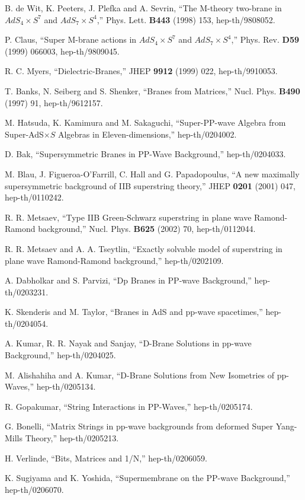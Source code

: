 \documentclass[a4paper,12pt]{article}
\begin{document}
\begin{thebibliography}{99}
 B. de Wit, K. Peeters, J. Plefka and A. Sevrin,
``The M-theory two-brane in $AdS_4 \times S^7$ and $AdS_7 \times
S^4$,'' Phys. Lett. {\bf B443} (1998) 153, hep-th/9808052.

 P. Claus, ``Super M-brane actions in $AdS_4
\times S^7$ and $AdS_7 \times S^4$,'' Phys. Rev. {\bf D59} (1999)
066003, hep-th/9809045.

 R. C. Myers, ``Dielectric-Branes,'' JHEP {\bf
9912} (1999) 022, hep-th/9910053.

 T. Banks, N. Seiberg and S. Shenker, ``Branes
from Matrices,'' Nucl. Phys. {\bf B490} (1997) 91, hep-th/9612157.

 M. Hatsuda, K. Kamimura and M. Sakaguchi,
``Super-PP-wave Algebra from Super-AdS$\times S$ Algebras in
Eleven-dimensions,'' hep-th/0204002.

 D. Bak, ``Supersymmetric Branes in PP-Wave
Background,'' hep-th/0204033.

 M. Blau, J. Figueroa-O'Farrill, C. Hall and G.
Papadopoulus, ``A new maximally supersymmetric background of IIB
superstring theory,'' JHEP {\bf 0201} (2001) 047, hep-th/0110242.

 R. R. Metsaev, ``Type IIB Green-Schwarz
superstring in plane wave Ramond-Ramond background,'' Nucl. Phys.
{\bf B625} (2002) 70, hep-th/0112044.

 R. R. Metsaev and A. A. Tseytlin, ``Exactly
solvable model of superstring in plane wave Ramond-Ramond
background,'' hep-th/0202109.

 A. Dabholkar and S. Parvizi, ``Dp Branes in PP-wave
Background,'' hep-th/0203231.

 K. Skenderis and M. Taylor, ``Branes in AdS and
pp-wave spacetimes,'' hep-th/0204054.

 A. Kumar, R. R. Nayak and Sanjay, ``D-Brane Solutions in 
pp-wave Background,'' hep-th/0204025. 

 M. Alishahiha and A. Kumar, ``D-Brane Solutions from New 
Isometries of pp-Waves,'' hep-th/0205134. 

 R. Gopakumar, ``String Interactions in PP-Waves,''
hep-th/0205174.

 G. Bonelli, ``Matrix Strings in pp-wave backgrounds
from deformed Super Yang-Mills Theory,'' hep-th/0205213.

 H. Verlinde, ``Bits, Matrices and 1/N,''
hep-th/0206059.

 K. Sugiyama and K. Yoshida, ``Supermembrane on
the PP-wave Background,'' hep-th/0206070.
\end{thebibliography}
\end{document}
